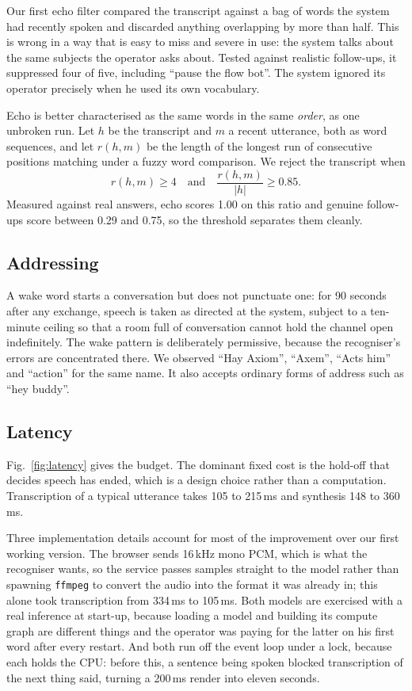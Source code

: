 \documentclass[conference]{IEEEtran}
\begin{document}
Our first echo filter compared the transcript against a bag of words the system
had recently spoken and discarded anything overlapping by more than half. This
is wrong in a way that is easy to miss and severe in use: the system talks
about the same subjects the operator asks about. Tested against realistic
follow-ups, it suppressed four of five, including ``pause the flow bot''. The
system ignored its operator precisely when he used its own vocabulary.

Echo is better characterised as the same words in the same \emph{order}, as one
unbroken run. Let $h$ be the transcript and $m$ a recent utterance, both as
word sequences, and let $r(h,m)$ be the length of the longest run of
consecutive positions matching under a fuzzy word comparison. We reject the
transcript when
\begin{equation}
r(h,m) \geq 4 \quad\text{and}\quad \frac{r(h,m)}{|h|} \geq 0.85 .
\end{equation}
Measured against real answers, echo scores 1.00 on this ratio and genuine
follow-ups score between 0.29 and 0.75, so the threshold separates them
cleanly.

\subsection{Addressing}
A wake word starts a conversation but does not punctuate one: for 90 seconds
after any exchange, speech is taken as directed at the system, subject to a
ten-minute ceiling so that a room full of conversation cannot hold the channel
open indefinitely. The wake pattern is deliberately permissive, because the
recogniser's errors are concentrated there. We observed ``Hay Axiom'',
``Axem'', ``Acts him'' and ``action'' for the same name. It also accepts
ordinary forms of address such as ``hey buddy''.

\subsection{Latency}
Fig.~\ref{fig:latency} gives the budget. The dominant fixed cost is the
hold-off that decides speech has ended, which is a design choice rather than a
computation. Transcription of a typical utterance takes 105 to 215\,ms and
synthesis 148 to 360\,ms.

Three implementation details account for most of the improvement over our first
working version. The browser sends 16\,kHz mono PCM, which is what the
recogniser wants, so the service passes samples straight to the model rather
than spawning \texttt{ffmpeg} to convert the audio into the format it was
already in; this alone took transcription from 334\,ms to 105\,ms. Both models
are exercised with a real inference at start-up, because loading a model and
building its compute graph are different things and the operator was paying for
the latter on his first word after every restart. And both run off the event
loop under a lock, because each holds the CPU: before this, a sentence being
spoken blocked transcription of the next thing said, turning a 200\,ms render
into eleven seconds.
\end{document}
